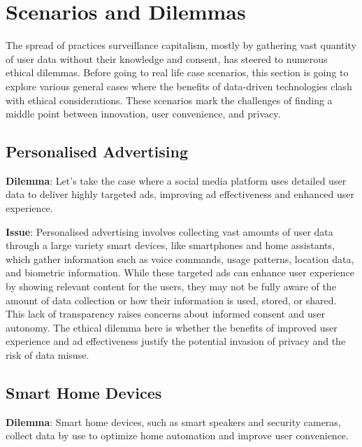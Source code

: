 \section{Scenarios and Dilemmas}\label{sec:scenarios-and-dilemmas}
The spread of practices surveillance capitalism, mostly by gathering vast quantity of user data without their knowledge and consent, has steered to numerous ethical dilemmas.
Before going to real life case scenarios, this section is going to explore various general cases where the benefits of data-driven technologies clash with ethical considerations.
These scenarios mark the challenges of finding a middle point between innovation, user convenience, and privacy.

\subsection{Personalised Advertising}\label{subsec:personalised-advertising}

\textbf{Dilemma}: Let's take the case where a social media platform uses detailed user data to deliver highly targeted ads, improving ad effectiveness and enhanced user experience.

\textbf{Issue}: Personalised advertising involves collecting vast amounts of user data through a large variety smart devices, like smartphones and home assistants, which gather information such as voice commands, usage patterns, location data, and biometric information.
While these targeted ads can enhance user experience by showing relevant content for the users, they may not be fully aware of the amount of data collection or how their information is used, stored, or shared.
This lack of transparency raises concerns about informed consent and user autonomy.
The ethical dilemma here is whether the benefits of improved user experience and ad effectiveness justify the potential invasion of privacy and the risk of data misuse.

\subsection{Smart Home Devices}\label{subsec:smart-home-devices}

\textbf{Dilemma}: Smart home devices, such as smart speakers and security cameras, collect data by use to optimize home automation and improve user convenience.

